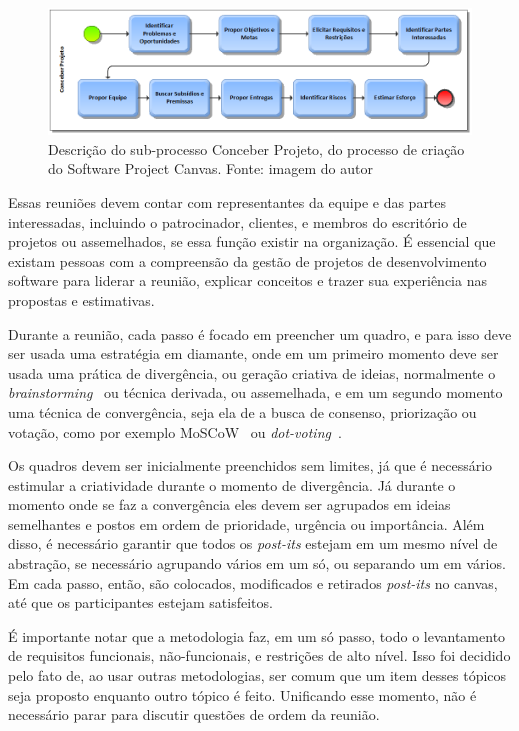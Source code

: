 \documentclass[a4]{report}
\begin{document}
\begin{figure}[htb]
    \centering
    \includegraphics[width=\textwidth]{imagens/Conceber Projeto do Software Project Canvas.png}
    \caption{Descrição do sub-processo Conceber Projeto, do processo de criação do Software Project Canvas. Fonte: imagem do autor}
    \label{fig:bpmn2}
\end{figure}


Essas reuniões devem contar com representantes da equipe e das partes interessadas, incluindo o patrocinador, clientes, e membros do escritório de projetos ou assemelhados, se essa função existir na organização. É essencial que existam pessoas com a compreensão da gestão de projetos de desenvolvimento software para liderar a reunião, explicar conceitos e trazer sua experiência nas propostas e estimativas.

Durante a reunião, cada passo é focado em preencher um quadro, e para isso deve ser usada uma estratégia em diamante, onde em um primeiro momento deve ser usada uma prática de divergência, ou geração criativa de ideias, normalmente o \textit{brainstorming}~\citep{tracy:2015} ou técnica derivada, ou assemelhada, e em um segundo momento uma técnica de convergência,  seja ela de a busca de consenso, priorização ou votação, como por exemplo MoSCoW~\citep{dsdm:2nd} ou \textit{dot-voting}~\citep{gray:2010}.

Os quadros devem ser inicialmente preenchidos sem limites, já que é necessário estimular a criatividade durante o momento de divergência. Já durante o momento onde se faz a convergência eles devem ser agrupados em ideias semelhantes e postos em ordem de prioridade, urgência ou importância. Além disso, é necessário garantir que todos os \textit{post-its} estejam em um mesmo nível de abstração, se necessário agrupando vários em um só, ou separando um em vários.
Em cada passo, então, são colocados, modificados e retirados \textit{post-its} no canvas, até que os participantes estejam satisfeitos.

É importante notar que a metodologia faz, em um só passo, todo o levantamento de requisitos funcionais, não-funcionais, e restrições de alto nível. Isso foi decidido pelo fato de, ao usar outras metodologias, ser comum que um item desses tópicos seja proposto enquanto outro tópico é feito. Unificando esse momento, não é necessário parar para discutir questões de ordem da reunião.
\end{document}
